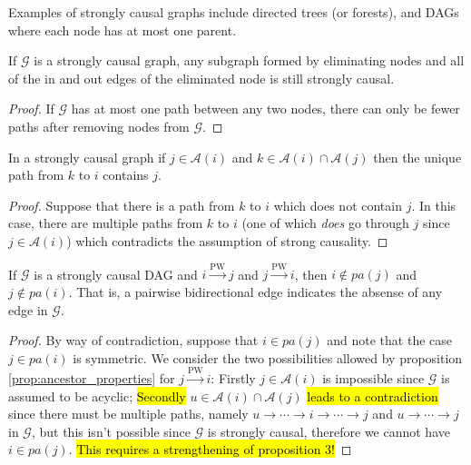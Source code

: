 \documentclass[12pt]{article}
\def\pwgc{\overset{\text{PW}}{\rightarrow}}  %
\def\gcg{\mathcal{G}}  %
\newcommand{\pa}[1]{pa(#1)}  %
\newcommand{\anc}[1]{\mathcal{A}(#1)}  %
\begin{document}
Examples of strongly causal graphs include directed trees (or
forests), and DAGs where each node has at most one parent.

\begin{lemma}
  \label{lem:still_strongly_causal}
  If $\gcg$ is a strongly causal graph, any subgraph formed by eliminating nodes
  and all of the in and out edges of the eliminated node is still strongly causal.
\end{lemma}
\begin{proof}
  If $\gcg$ has at most one path between any two nodes, there can only
  be fewer paths after removing nodes from $\gcg$.
\end{proof}


\begin{lemma}
  \label{prop:sc_graph_common_anc}
  In a strongly causal graph if $j \in \anc{i}$ and $k \in \anc{i} \cap \anc{j}$ then the unique path from $k$ to $i$ contains $j$.
\end{lemma}
\begin{proof}
  Suppose that there is a path from $k$ to $i$ which does not contain $j$.  In this case, there are multiple paths from $k$ to $i$ (one of which \textit{does} go through $j$ since $j \in \anc{i}$) which contradicts the assumption of strong causality.
\end{proof}


\begin{proposition}
  If $\gcg$ is a strongly causal DAG and $i \pwgc j$ and $j \pwgc i$, then $i \not\in \pa{j}$ and $j \not\in \pa{i}$.  That is, a pairwise bidirectional edge indicates the absense of any edge in $\gcg$.
\end{proposition}
\begin{proof}
  By way of contradiction, suppose that $i \in \pa{j}$ and note that the case $j \in \pa{i}$ is symmetric.  We consider the two possibilities allowed by proposition \ref{prop:ancestor_properties} for $j \pwgc i$:  Firstly $j \in \anc{i}$ is impossible since $\gcg$ is assumed to be acyclic; \hl{Secondly} $u \in \anc{i} \cap \anc{j}$ \hl{leads to a contradiction} since there must be multiple paths, namely $u \rightarrow \cdots \rightarrow i \rightarrow \cdots \rightarrow j$ and $u \rightarrow \cdots \rightarrow j$ in $\gcg$, but this isn't possible since $\gcg$ is strongly causal, therefore we cannot have $i \in \pa{j}$. \hl{This requires a strengthening of proposition 3!}
\end{proof}
\end{document}
